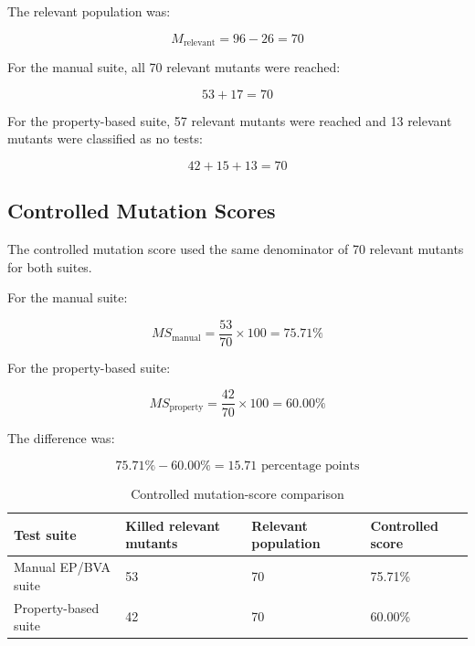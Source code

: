 \documentclass[12pt]{article}
\begin{document}
The relevant population was:

\begin{equation}
M_{\text{relevant}}
=
96-26
=
70
\end{equation}

For the manual suite, all 70 relevant mutants were reached:

\begin{equation}
53+17=70
\end{equation}

For the property-based suite, 57 relevant mutants were reached and 13 relevant
mutants were classified as no tests:

\begin{equation}
42+15+13=70
\end{equation}

\subsection{Controlled Mutation Scores}

The controlled mutation score used the same denominator of 70 relevant mutants
for both suites.

For the manual suite:

\begin{equation}
MS_{\text{manual}}
=
\frac{53}{70}\times 100
=
75.71\%
\end{equation}

For the property-based suite:

\begin{equation}
MS_{\text{property}}
=
\frac{42}{70}\times 100
=
60.00\%
\end{equation}

The difference was:

\begin{equation}
75.71\%-60.00\%
=
15.71
\text{ percentage points}
\end{equation}

\begin{table}[H]
\centering
\caption{Controlled mutation-score comparison}
\label{tab:controlled-mutation-score}
\footnotesize
\setlength{\tabcolsep}{4pt}

\begin{tabular}{|p{4.2cm}|p{3.2cm}|p{2.8cm}|p{2.6cm}|}
\hline
\textbf{Test suite} &
\textbf{Killed relevant mutants} &
\textbf{Relevant population} &
\textbf{Controlled score} \\
\hline

Manual EP/BVA suite &
53 &
70 &
75.71\% \\
\hline

Property-based suite &
42 &
70 &
60.00\% \\
\hline

\end{tabular}

\setlength{\tabcolsep}{6pt}
\end{table}
\end{document}
